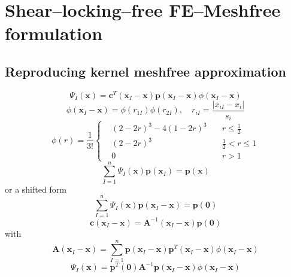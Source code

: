 \section{Shear--locking--free FE--Meshfree formulation}
\subsection{Reproducing kernel meshfree approximation}
\begin{equation}
    \Psi_I(\boldsymbol x) = \boldsymbol c^T(\boldsymbol x_I-\boldsymbol x)\boldsymbol p(\boldsymbol x_I-\boldsymbol x)\phi(\boldsymbol x_I-\boldsymbol x)
\end{equation}
\begin{equation}
    \phi(\boldsymbol x_I-\boldsymbol x) = \phi(r_{1I})\phi(r_{2I}),\quad
    r_{iI} = \frac{\vert x_{iI}-x_i\vert}{s_i}
\end{equation}
\begin{equation}
    \phi(r) = \frac{1}{3!}\left\{
        \begin{aligned}
            &(2-2r)^3-4(1-2r)^3 \quad& r\le \frac{1}{2} \\
            &(2-2r)^3 & \frac{1}{2} < r \le 1 \\
            &0 & r > 1
        \end{aligned}
    \right .
\end{equation}
\begin{equation}
    \sum_{I=1}^{n} \Psi_I(\boldsymbol x)\boldsymbol p(\boldsymbol x_I) = \boldsymbol p(\boldsymbol x)
\end{equation}
or a shifted form
\begin{equation}
    \sum_{I=1}^n \Psi_I(\boldsymbol x) \boldsymbol p(\boldsymbol x_I-\boldsymbol x) = \boldsymbol p(\boldsymbol 0)
\end{equation}
\begin{equation}
    \boldsymbol c(\boldsymbol x_I-\boldsymbol x) = \boldsymbol A^{-1}(\boldsymbol x_I-\boldsymbol x)\boldsymbol p(\boldsymbol 0)
\end{equation}
with
\begin{equation}
    \boldsymbol A(\boldsymbol x_I-\boldsymbol x) = \sum_{I=1}^n \boldsymbol p(\boldsymbol x_I-\boldsymbol x)\boldsymbol p^T(\boldsymbol x_I-\boldsymbol x)\phi(\boldsymbol x_I-\boldsymbol x)
\end{equation}
\begin{equation}
    \Psi_I(\boldsymbol x) = \boldsymbol p^T(\boldsymbol 0) \boldsymbol A^{-1} \boldsymbol p(\boldsymbol x_I-\boldsymbol x)\phi(\boldsymbol x_I-\boldsymbol x)
\end{equation}
